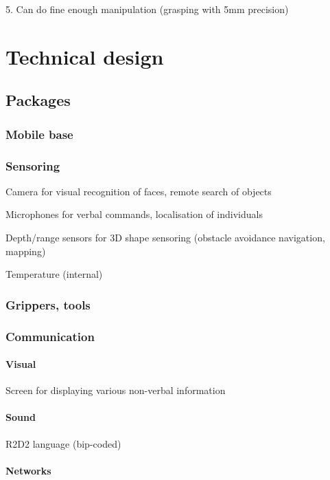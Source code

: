 \documentclass{report}
\begin{document}
5. Can do fine enough manipulation (grasping with 5mm precision)

\chapter{Technical design}
\section{Packages}
\subsection{Mobile base}
\subsection{Sensoring}
Camera for visual recognition of faces, remote search of objects

Microphones for verbal commands, localisation of individuals

Depth/range sensors for 3D shape sensoring (obstacle avoidance navigation, mapping)

Temperature (internal)
\subsection{Grippers, tools}
\subsection{Communication}
\subsubsection{Visual}
Screen for displaying various non-verbal information
\subsubsection{Sound}
R2D2 language (bip-coded)
\subsubsection{Networks}
\end{document}
